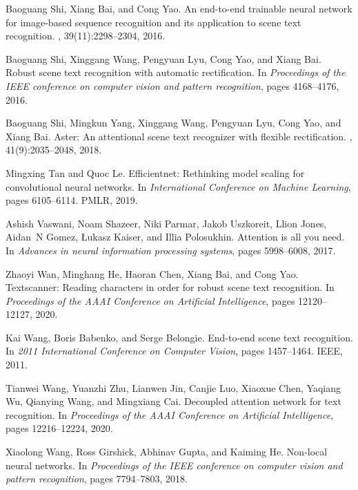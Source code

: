 \documentclass[final]{cvpr}
\begin{document}
{\begin{thebibliography}{10}
Baoguang Shi, Xiang Bai, and Cong Yao.
\newblock An end-to-end trainable neural network for image-based sequence
  recognition and its application to scene text recognition.
,
  39(11):2298--2304, 2016.

Baoguang Shi, Xinggang Wang, Pengyuan Lyu, Cong Yao, and Xiang Bai.
\newblock Robust scene text recognition with automatic rectification.
\newblock In {\em Proceedings of the IEEE conference on computer vision and
  pattern recognition}, pages 4168--4176, 2016.

Baoguang Shi, Mingkun Yang, Xinggang Wang, Pengyuan Lyu, Cong Yao, and Xiang
  Bai.
\newblock Aster: An attentional scene text recognizer with flexible
  rectification.
,
  41(9):2035--2048, 2018.

Mingxing Tan and Quoc Le.
\newblock Efficientnet: Rethinking model scaling for convolutional neural
  networks.
\newblock In {\em International Conference on Machine Learning}, pages
  6105--6114. PMLR, 2019.

Ashish Vaswani, Noam Shazeer, Niki Parmar, Jakob Uszkoreit, Llion Jones,
  Aidan~N Gomez, {\L}ukasz Kaiser, and Illia Polosukhin.
\newblock Attention is all you need.
\newblock In {\em Advances in neural information processing systems}, pages
  5998--6008, 2017.

Zhaoyi Wan, Minghang He, Haoran Chen, Xiang Bai, and Cong Yao.
\newblock Textscanner: Reading characters in order for robust scene text
  recognition.
\newblock In {\em Proceedings of the AAAI Conference on Artificial
  Intelligence}, pages 12120--12127, 2020.

Kai Wang, Boris Babenko, and Serge Belongie.
\newblock End-to-end scene text recognition.
\newblock In {\em 2011 International Conference on Computer Vision}, pages
  1457--1464. IEEE, 2011.

Tianwei Wang, Yuanzhi Zhu, Lianwen Jin, Canjie Luo, Xiaoxue Chen, Yaqiang Wu,
  Qianying Wang, and Mingxiang Cai.
\newblock Decoupled attention network for text recognition.
\newblock In {\em Proceedings of the AAAI Conference on Artificial
  Intelligence}, pages 12216--12224, 2020.

Xiaolong Wang, Ross Girshick, Abhinav Gupta, and Kaiming He.
\newblock Non-local neural networks.
\newblock In {\em Proceedings of the IEEE conference on computer vision and
  pattern recognition}, pages 7794--7803, 2018.


\end{thebibliography}}
\end{document}
